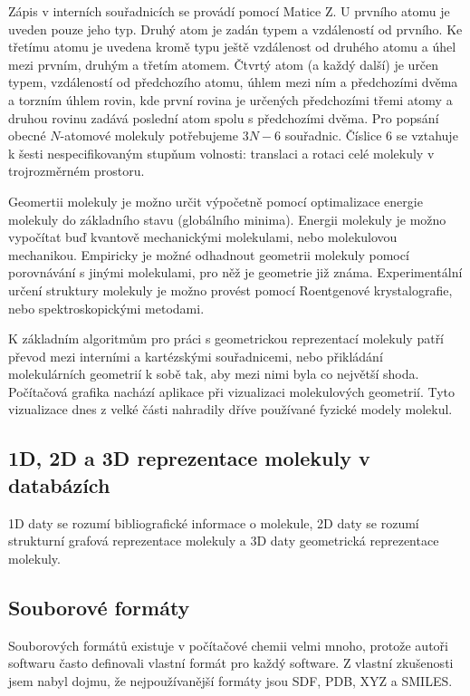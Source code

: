 \documentclass[
  color, %
  table, %
  lof,   %
  lot,   %
]{fithesis3}
\begin{document}
Zápis v interních souřadnicích se provádí pomocí Matice Z. U prvního atomu je uveden pouze jeho typ. Druhý atom je zadán typem a vzdáleností od prvního. Ke třetímu atomu je uvedena kromě typu ještě vzdálenost od druhého atomu a úhel mezi prvním, druhým a třetím atomem. Čtvrtý atom (a každý další) je určen typem, vzdáleností od předchozího atomu, úhlem mezi ním a předchozími dvěma a torzním úhlem rovin, kde první rovina je určených předchozími třemi atomy a druhou rovinu zadává poslední atom spolu s předchozími dvěma. Pro popsání obecné $N$-atomové molekuly potřebujeme $3N-6$ souřadnic. Číslice 6 se vztahuje k šesti nespecifikovaným stupňum volnosti: translaci a rotaci celé molekuly v trojrozměrném prostoru.

Geomertii molekuly je možno určit výpočetně pomocí optimalizace energie molekuly do základního stavu (globálního minima). Energii molekuly je možno vypočítat buď kvantově mechanickými molekulami, nebo molekulovou mechanikou. Empiricky je možné odhadnout geometrii molekuly pomocí porovnávání s jinými molekulami, pro něž je geometrie již známa. Experimentální určení struktury molekuly je možno provést pomocí Roentgenové krystalografie, nebo spektroskopickými metodami.

K základním algoritmům pro práci s geometrickou reprezentací molekuly patří převod mezi interními a kartézskými souřadnicemi, nebo přikládání molekulárních geometrií k sobě tak, aby mezi nimi byla co největší shoda. Počítačová grafika nachází aplikace při vizualizaci molekulových geometrií. Tyto vizualizace dnes z velké části nahradily dříve používané fyzické modely molekul.

\subsection{1D, 2D a 3D reprezentace molekuly v databázích}

1D daty se rozumí bibliografické informace o molekule, 2D daty se rozumí strukturní grafová reprezentace molekuly a 3D daty geometrická reprezentace molekuly.

\subsection{Souborové formáty}

Souborových formátů existuje v počítačové chemii velmi mnoho, protože autoři softwaru často definovali vlastní formát pro každý software. Z vlastní zkušenosti jsem nabyl dojmu, že nejpoužívanější formáty jsou SDF, PDB, XYZ a SMILES.
\end{document}

